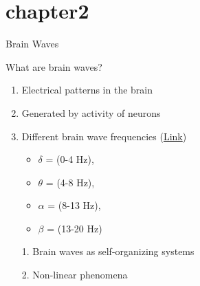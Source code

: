 \documentclass[xetex,notheorems,hyperref={pdfpagelabels=true},xcolor=table]{beamer}
\newcounter{chapter}
\theoremstyle{plain}
\theoremstyle{definition}
\theoremstyle{example}
\theoremstyle{example}
\begin{document}
\section{chapter2}
\begin{frame}{Brain Waves}
    \begin{block}{What are brain waves?}
        \begin{enumerate}[\indent $\blacksquare$]
        \item Electrical patterns in the brain
        \item Generated by activity of neurons
        \item Different brain wave frequencies (\href{https://www.ncbi.nlm.nih.gov/pmc/articles/PMC7176745/#:~:text=These\%20changes\%20can\%20be\%20deduced,(13\%E2\%80\%9020\%20Hz).&text=Delta\%20waves\%20are\%20more\%20frequent\%20during\%20sleep.}{Link})
        \begin{itemize}
            \item $\delta$ = (0-4 Hz), 
            \item $\theta$ = (4-8 Hz), 
            \item $\alpha$ = (8-13 Hz), 
            \item $\beta$ = (13-20 Hz) 
        \end{itemize}
    \end{enumerate}
    \end{block}
\begin{center}
\end{center}
 \begin{itemize}
     \item[1.] Brain waves as self-organizing systems 
     \item[2.] Non-linear phenomena
 \end{itemize}

\end{frame}
\end{document}
